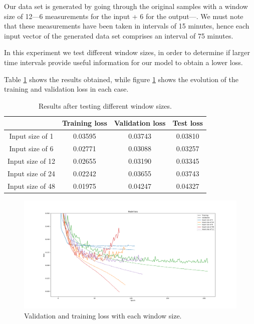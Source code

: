 \documentclass[]{article}
\begin{document}
Our data set is generated by going through the original samples with a window size of 12---6 measurements for the input + 6 for the output---. We must note that these measurements have been taken in intervals of 15 minutes, hence each input vector of the generated data set comprises an interval of 75 minutes.

In this experiment we test different window sizes, in order to determine if larger time intervals provide useful information for our model to obtain a lower loss.

Table \ref{t:window} shows the results obtained, while figure \ref{f:window} shows the evolution of the training and validation loss in each case.

\begin{table}[H]
	\centering
	\begin{tabular}{@{}cccc@{}}
		\toprule
		& Training loss & Validation loss & Test loss \\ \midrule
		Input size of 1  & 0.03595       & 0.03743         & 0.03810   \\
		Input size of 6  & 0.02771       & 0.03088         & 0.03257   \\
		Input size of 12 & 0.02655       & 0.03190         & 0.03345   \\
		Input size of 24 & 0.02242       & 0.03655         & 0.03743   \\
		Input size of 48 & 0.01975       & 0.04247         & 0.04327   \\ \bottomrule
	\end{tabular}
	\caption{Results after testing different window sizes.}
	\label{t:window}
\end{table}

\begin{figure}[H]
	\centering
	\includegraphics[width=\textwidth]{window}
	\caption{Validation and training loss with each window size.}
	\label{f:window}
\end{figure}
\end{document}
